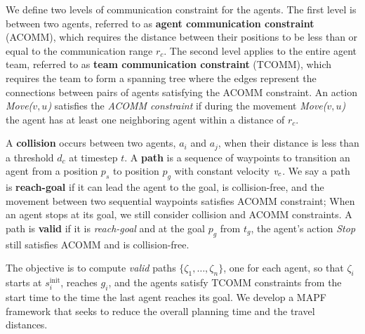 \documentclass[letterpaper, 10 pt, conference]{ieeeconf}  %
\newcommand{\Var}[1]{\ensuremath{{{\mathrm{#1}}}}}
\newcommand{\GoalPos}{\ensuremath{g}}
\newcommand{\Traj}{\ensuremath{\zeta}}
\begin{document}
We define two levels of communication constraint for the agents. 
The first level is between two agents, referred to as \textbf{agent communication constraint} (ACOMM), 
which requires the distance between their positions to be less than 
or equal to the communication range $r_c$.
The second level applies to the entire agent team, referred to 
as \textbf{team communication constraint} (TCOMM), which requires 
the team to form a spanning tree where the edges represent the 
connections between pairs of agents satisfying the ACOMM constraint.
An action \textit{Move($v,u$)} satisfies the \textit{ACOMM constraint} 
if during the movement \textit{Move($v,u$)} the agent has at least one 
neighboring agent within a distance of $r_c$.

A \textbf{collision} occurs between two agents, $a_i$ and $a_j$, when their distance is less than a threshold $d_c$ at timestep $t$. 
A \textbf{path} is a sequence of waypoints to transition an agent from a position $p_s$ to position $p_g$ with constant velocity $\emph{v}_c$. We say a path is \textbf{reach-goal} if it can lead the agent to the goal, is collision-free, and the movement between two sequential waypoints satisfies ACOMM constraint;
When an agent stops at its goal, we still consider collision and ACOMM constraints. 
A path is \textbf{valid} if it is \emph{reach-goal} and at the goal $p_g$ from $t_g$, the agent's action \textit{Stop} still satisfies ACOMM and is collision-free.

The objective is to compute \textit{valid} paths $\{\Traj_1, \ldots, \Traj_n\}$, one for each agent, so that $\Traj_i$ starts at $s^\Var{init}_i$, reaches $\GoalPos_i$, and the agents satisfy TCOMM constraints from the start time to the time the last agent reaches its goal. 
We develop a MAPF framework that seeks to reduce the overall planning time and the travel distances.
\end{document}
